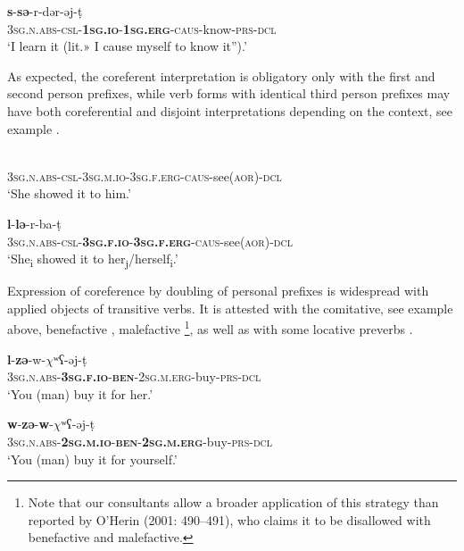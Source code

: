 \documentclass[output=paper]{langscibook}
\begin{document}
    \ex 
    \label{ex:Arkadiev:44b}
    \textbf{{s}}{{}-}\textbf{{s{ə}}}{{}-r-d{ə}r-{ə}j-t{̣}}\\
     \textsc{3sg.n.abs-csl-}\textbf{\textsc{1sg.io}}\textsc{{}-}\textbf{\textsc{1sg.erg}}\textsc{{}-caus}{}-know-\textsc{prs-dcl}\\
    \glt ‘I learn it (lit.» I cause myself to know it”).’ \citep[188]{Tabulova1976}
\z
\z

As expected, the coreferent interpretation is obligatory only with the first and second person prefixes, while verb forms with identical third person prefixes may have both coreferential and disjoint interpretations depending on the context, see example .

\ea 
\label{ex:Arkadiev:45}
    \ea 
    \label{ex:Arkadiev:45a}
\\
      \textsc{3sg.n.abs-csl-3sg.m.io-3sg.f.erg-caus}{}-see(\textsc{aor)-dcl}\\
    \glt ‘She showed it to him.’
    
    \ex 
    \label{ex:Arkadiev:45b}
    \textbf{{l}}{{}-}\textbf{{l{ə}}}{{}-r-ba-t{̣}}\\
     \textsc{3sg.n.abs-csl-}\textbf{\textsc{3sg.f.io}}\textsc{{}-}\textbf{\textsc{3sg.f.erg}}\textsc{{}-caus}{}-see(\textsc{aor)-dcl}\\
    \glt ‘She\textsubscript{i} showed it to her\textsubscript{j}/herself\textsubscript{i}.’
\z
\z

Expression of coreference by doubling of personal prefixes is widespread with applied objects of transitive verbs. It is attested with the comitative, see example  above, benefactive , malefactive \footnote{Note that our consultants allow a broader application of this strategy than reported by O’Herin (2001: 490–491), who claims it to be disallowed with benefactive and malefactive.}, as well as with some locative preverbs .


\ea 
\label{ex:Arkadiev:46}
    \ea 
    \label{ex:Arkadiev:46a}
    \textbf{{l}}{{}-}\textbf{{z{ə}}}{{}-w-$\chi {ʷ}{ʕ}$-{ə}j-t{̣}}\\
      \textsc{3sg.n.abs-}\textbf{\textsc{3sg.f.io}}\textsc{{}-}\textbf{\textsc{ben}}\textsc{{}-2sg.m.erg}{}-buy-\textsc{prs-dcl}\\
    \glt ‘You (man) buy it for her.’
    
    \ex 
    \label{ex:Arkadiev:46b}
    \textbf{{w}}{{}-}\textbf{{z{ə}}}{{}-}\textbf{{w}}{{}-$\chi {ʷ}{ʕ}$-{ə}j-t{̣}}\\
    \textsc{3sg.n.abs-}\textbf{\textsc{2sg.m.io}}\textsc{{}-}\textbf{\textsc{ben}}\textsc{{}-}\textbf{\textsc{2sg.m.erg}}{}-buy-\textsc{prs-dcl}\\
    \glt  ‘You (man) buy it for yourself.’
\z
\z
\end{document}
